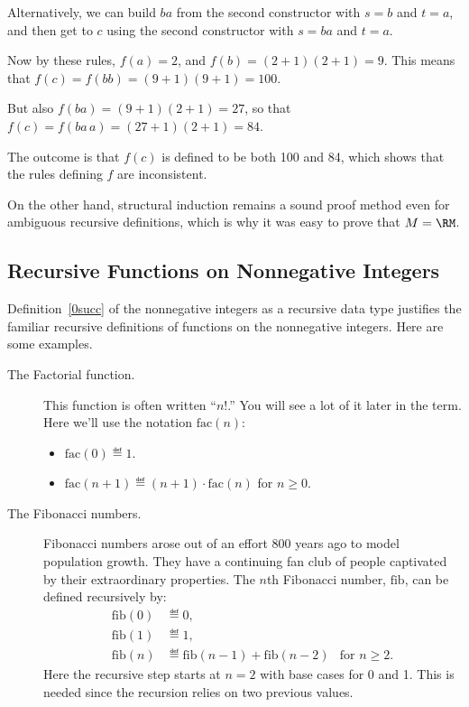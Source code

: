 \begin{definition}
Alternatively, we can build $ba$ from the second constructor with $s=b$
and $t=a$, and then get to $c$ using the second constructor with $s=ba$
and $t=a$.

Now by these rules, $f(a) = 2$, and $f(b) = (2+1)(2+1)=9$.  This means
that $f(c) = f(bb)= (9+1)(9+1)=100$.

But also $f(ba) = (9+1)(2+1) = 27$, so that $f(c) = f(ba\,a) = (27 +1)
(2+1) = 84$.

The outcome is that $f(c)$ is defined to be both 100 and 84, which shows
that the rules defining $f$ are inconsistent.

On the other hand, structural induction remains a sound proof method even
for ambiguous recursive definitions, which is why it was easy to prove
that $M=\RM$.

\subsection{Recursive Functions on Nonnegative Integers}

Definition~\ref{0succ} of the nonnegative integers as a recursive data
type justifies the familiar recursive definitions of functions on the
nonnegative integers.  Here are some examples.

\begin{description}
\item[The Factorial function.] This function is often written ``$n!$.''
You will see a lot of it later in the term.  Here we'll use the notation
$\text{fac}(n)$:
\begin{itemize}
\item $\text{fac}(0) \eqdef 1$.
\item $\text{fac}(n+1) \eqdef (n+1)\cdot \text{fac}(n)$ for $n \ge 0$.
\end{itemize}

\item[The Fibonacci numbers.]  Fibonacci numbers arose out of an effort 800
  years ago to model population growth.  They have a continuing fan club of
  people captivated by their extraordinary properties.  The $n$th Fibonacci
  number, $\text{fib}$, can be defined recursively by:
\begin{align*}
\text{fib}(0) &\eqdef 0,\\ 
\text{fib}(1) &\eqdef 1,\\ 
\text{fib}(n) &\eqdef \text{fib}(n-1) + \text{fib}(n-2) &\mbox{for $n \geq 2$.} 
\end{align*}
Here the recursive step starts at $n=2$ with base cases for 0 and 1.  This
is needed since the recursion relies on two previous values.


\end{description}
\end{definition}
